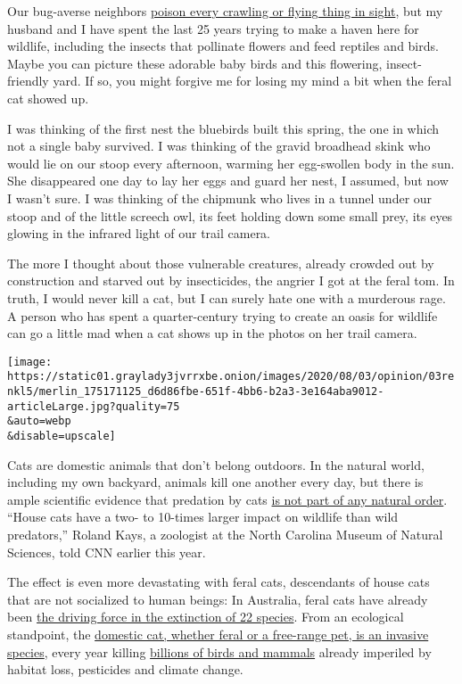 Our bug-averse neighbors
\href{https://www.nytimes3xbfgragh.onion/2020/05/18/opinion/lawn-pesticides-insect-extinction.html?searchResultPosition=1}{poison
every crawling or flying thing in sight}, but my husband and I have
spent the last 25 years trying to make a haven here for wildlife,
including the insects that pollinate flowers and feed reptiles and
birds. Maybe you can picture these adorable baby birds and this
flowering, insect-friendly yard. If so, you might forgive me for losing
my mind a bit when the feral cat showed up.

I was thinking of the first nest the bluebirds built this spring, the
one in which not a single baby survived. I was thinking of the gravid
broadhead skink who would lie on our stoop every afternoon, warming her
egg-swollen body in the sun. She disappeared one day to lay her eggs and
guard her nest, I assumed, but now I wasn't sure. I was thinking of the
chipmunk who lives in a tunnel under our stoop and of the little screech
owl, its feet holding down some small prey, its eyes glowing in the
infrared light of our trail camera.

The more I thought about those vulnerable creatures, already crowded out
by construction and starved out by insecticides, the angrier I got at
the feral tom. In truth, I would never kill a cat, but I can surely hate
one with a murderous rage. A person who has spent a quarter-century
trying to create an oasis for wildlife can go a little mad when a cat
shows up in the photos on her trail camera.

\texttt{[image: https://static01.graylady3jvrrxbe.onion/images/2020/08/03/opinion/03renkl5/merlin\_175171125\_d6d86fbe-651f-4bb6-b2a3-3e164aba9012-articleLarge.jpg?quality=75\\\&auto=webp\\\&disable=upscale]}

Cats are domestic animals that don't belong outdoors. In the natural
world, including my own backyard, animals kill one another every day,
but there is ample scientific evidence that predation by cats
\href{https://www.cnn.com/2020/03/12/world/pet-cats-disrupt-wildlife-scn/index.html}{is
not part of any natural order}. ``House cats have a two- to 10-times
larger impact on wildlife than wild predators,'' Roland Kays, a
zoologist at the North Carolina Museum of Natural Sciences, told CNN
earlier this year.

The effect is even more devastating with feral cats, descendants of
house cats that are not socialized to human beings: In Australia, feral
cats have already been
\href{https://www.nytimes3xbfgragh.onion/2019/04/25/magazine/australia-cat-killing.html?searchResultPosition=8}{the
driving force in the extinction of 22 species}. From an ecological
standpoint, the \href{http://www.iucngisd.org/gisd/}{domestic cat,
whether feral or a free-range pet, is an invasive species}, every year
killing
\href{https://www.fws.gov/southeast/pubs/keep-cats-indoors.pdf}{billions
of birds and mammals} already imperiled by habitat loss, pesticides and
climate change.

